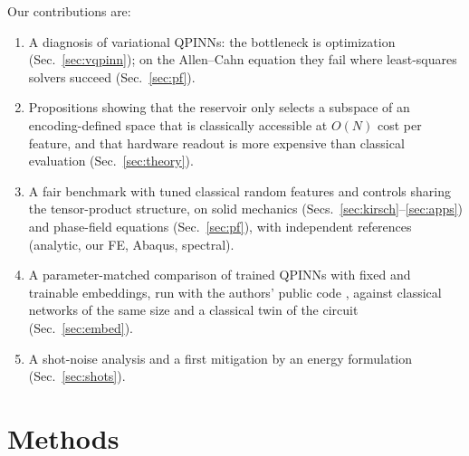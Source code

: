 \documentclass[11pt]{article}
\theoremstyle{remark}\newtheorem*{remark}{Remark}
\begin{document}
Our contributions are:
\begin{enumerate}
  \item A diagnosis of variational QPINNs: the bottleneck is optimization (Sec.~\ref{sec:vqpinn}); on the Allen--Cahn
        equation they fail where least-squares solvers succeed (Sec.~\ref{sec:pf}).
  \item Propositions showing that the reservoir only selects a subspace of an encoding-defined space that is classically
        accessible at $O(N)$ cost per feature, and that hardware readout is more expensive than classical evaluation
        (Sec.~\ref{sec:theory}).
  \item A fair benchmark with tuned classical random features and controls sharing the tensor-product structure,
        on solid mechanics (Secs.~\ref{sec:kirsch}--\ref{sec:apps}) and phase-field equations (Sec.~\ref{sec:pf}),
        with independent references (analytic, our FE, Abaqus, spectral).
  \item A parameter-matched comparison of trained QPINNs with fixed and trainable embeddings, run with the authors'
        public code \citep{berger2025teqpinn}, against classical networks of the same size and a classical twin of
        the circuit (Sec.~\ref{sec:embed}).
  \item A shot-noise analysis and a first mitigation by an energy formulation (Sec.~\ref{sec:shots}).
\end{enumerate}

\section{Methods}
\end{document}
